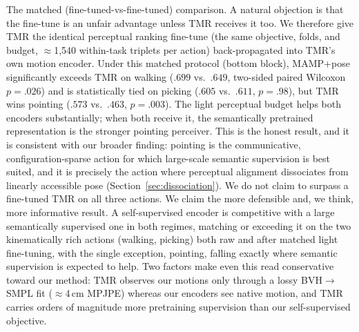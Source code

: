 \documentclass[letterpaper]{article} %
\begin{document}
{The matched (fine-tuned-vs-fine-tuned) comparison.} A natural objection is that the fine-tune is
an unfair advantage unless TMR receives it too. We therefore give TMR the {identical} perceptual
ranking fine-tune (the same objective, folds, and budget, $\approx$1{,}540 within-task triplets per
action) back-propagated into TMR's own motion encoder. Under this matched protocol (bottom block),
MAMP+pose significantly exceeds TMR on walking ($.699$ vs.\ $.649$, two-sided paired Wilcoxon
$p{=}.026$) and is statistically tied on picking ($.605$ vs.\ $.611$, $p{=}.98$), but {TMR wins
pointing} ($.573$ vs.\ $.463$, $p{=}.003$). The light perceptual budget helps {both} encoders
substantially; when both receive it, the semantically pretrained representation is the stronger
{pointing} perceiver. This is the honest result, and it is consistent with our broader finding: pointing
is the communicative, configuration-sparse action for which large-scale semantic supervision is best
suited, and it is precisely the action where perceptual alignment dissociates from linearly accessible
pose (Section~\ref{sec:dissociation}). We do {not} claim to surpass a fine-tuned TMR on all three
actions. We claim the more defensible and, we think, more informative result. A
{self-supervised} encoder is competitive with a large {semantically supervised} one in both
regimes, matching or exceeding it on the two kinematically rich actions (walking, picking) both raw
and after matched light fine-tuning, with the single exception, pointing, falling exactly where
semantic supervision is expected to help.
Two factors make even this read conservative toward our method: TMR observes our motions only through
a lossy BVH$\rightarrow$SMPL fit ($\approx$4\,cm MPJPE) whereas our encoders see native motion, and
TMR carries orders of magnitude more pretraining supervision than our self-supervised objective.
\end{document}
